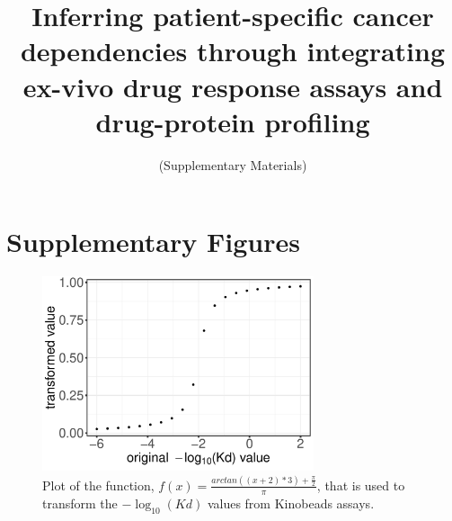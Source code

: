\documentclass{scrartcl}
\date{}
\title{Inferring patient-specific cancer dependencies through integrating ex-vivo drug response assays and drug-protein profiling}
\subtitle{(Supplementary Materials)}
\begin{document}
\maketitle

\section{Supplementary Figures}

\begin{figure}[h]
    \centering
    \includegraphics[width=8cm]{supp_arcTrans-1}
    \caption{Plot of the function, $f(x) = \frac{arctan((x + 2) * 3) + \frac{\pi}{2}}{\pi}$, that is used to transform the $-\log_{10}(Kd)$ values from Kinobeads assays.}
\end{figure}

\clearpage
\end{document}
